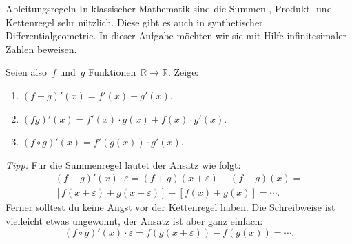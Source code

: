 \documentclass[twoside]{../zirkelblatt}
\newcommand{\RR}{\mathbb{R}}
\theoremstyle{definition}
\theoremstyle{plain}
\theoremstyle{remark}
\begin{document}
\begin{aufgabeShaded}{Ableitungsregeln}
In klassischer Mathematik sind die Summen-, Produkt- und Kettenregel sehr
nützlich. Diese gibt es auch in synthetischer Differentialgeometrie. In dieser
Aufgabe möchten wir sie mit Hilfe infinitesimaler Zahlen beweisen.

Seien also~$f$ und~$g$ Funktionen~$\RR \to \RR$. Zeige:
\begin{enumerate}
\item $(f+g)'(x) = f'(x) + g'(x)$.
\item $(fg)'(x) = f'(x) \cdot g(x) + f(x) \cdot g'(x)$.
\item $(f \circ g)'(x) = f'(g(x)) \cdot g'(x)$.
\end{enumerate}

\emph{Tipp:} Für die Summenregel lautet der Ansatz wie folgt:
\begin{multline*}(f+g)'(x) \cdot \varepsilon =
  (f+g)(x + \varepsilon) - (f+g)(x) = \\
  [f(x+\varepsilon) + g(x+\varepsilon)] - [f(x) + g(x)] = \cdots. \end{multline*}
Ferner solltest du keine Angst vor der Kettenregel haben. Die Schreibweise ist
vielleicht etwas ungewohnt, der Ansatz ist aber ganz einfach:
\[ (f \circ g)'(x) \cdot \varepsilon =
  f(g(x + \varepsilon)) - f(g(x)) = \cdots. \]
\end{aufgabeShaded}
\end{document}
